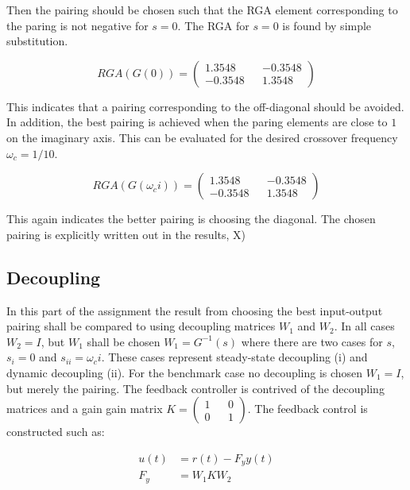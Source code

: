 \documentclass[a4paper, titlepage]{article}
\begin{document}
Then the pairing should be chosen such that the RGA element corresponding to the paring is not negative for $s=0$.
The RGA for $s=0$ is found by simple substitution.

\begin{equation}
RGA(G(0)) = 
\begin{pmatrix}
1.3548 && -0.3548 \\
-0.3548 && 1.3548
\end{pmatrix}
\end{equation}

This indicates that a pairing corresponding to the off-diagonal should be avoided.
In addition, the best pairing is achieved when the paring elements are close to $1$ on the imaginary axis.
This can be evaluated for the desired crossover frequency $\omega_c = 1/10$.

\begin{equation}
RGA(G(\omega_ci)) = 
\begin{pmatrix}
1.3548 && -0.3548 \\
-0.3548 && 1.3548
\end{pmatrix}
\end{equation}

This again indicates the better pairing is choosing the diagonal.
The chosen pairing is explicitly written out in the results, X)

\subsection{Decoupling}
In this part of the assignment the result from choosing the best input-output pairing shall be compared to using decoupling matrices $W_1$ and $W_2$.
In all cases $W_2 = I$, but $W_1$ shall be chosen $W_1 = G^{-1}(s)$ where there are two cases for $s$, $s_i = 0$ and $s_{ii}=\omega_ci$.
These cases represent steady-state decoupling (i) and dynamic decoupling (ii).
For the benchmark case no decoupling is chosen $W_1 = I$, but merely the pairing.
The feedback controller is contrived of the decoupling matrices and a gain gain matrix $K = \begin{pmatrix} 1 && 0 \\ 0 && 1 \end{pmatrix}$.
The feedback control is constructed such as:

\begin{equation}
\begin{split}
u(t) &= r(t) - F_yy(t) \\
F_y &= W_1KW_2
\end{split}
\label{equ:fbControl}
\end{equation}
\end{document}
